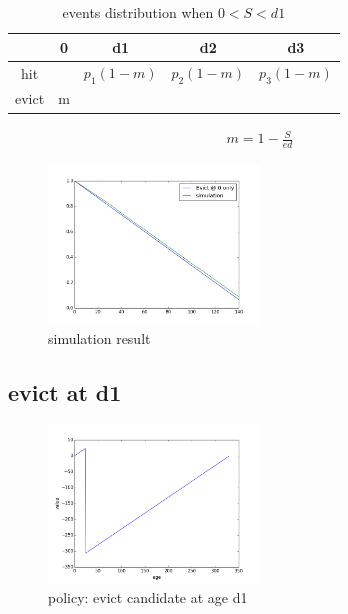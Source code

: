 \documentclass[12pt, letterpaper]{article}
\begin{document}
\begin{table}[H]
\begin{center}
\begin{tabular}{c|c c c c}
\hline
 & 0 & d1 & d2 & d3 \\
 \hline
hit & & $p_1 (1-m)$ & $p_2(1-m)$ & $p_3(1-m)$ \\
evict & m & & & 
\end{tabular}
\caption{events distribution when $0<S<d1$}
\end{center}
\end{table}

\begin{equation}
\begin{aligned}
m = 1 - \frac{S}{ed}
\end{aligned}
\end{equation}

\begin{figure}[H]
\centering
\includegraphics[width=0.5\textwidth]{sim_mru}
\caption{simulation result}
\end{figure}

\subsection{evict at d1}

\begin{figure}[H]
\centering
\includegraphics[width=0.5\textwidth]{evict_d1}
\caption{policy: evict candidate at age d1}
\end{figure}
\end{document}
